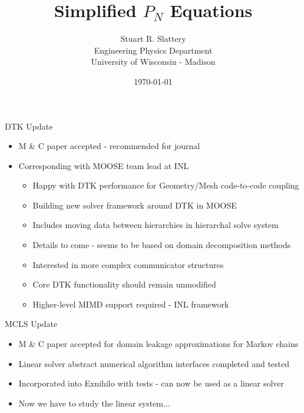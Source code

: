 \documentclass{beamer}
\author{Stuart R. Slattery
  \\ Engineering Physics Department
  \\ University of Wisconsin - Madison
}
\date{\today}
\title{Simplified $P_N$ Equations}
\begin{document}
\maketitle

\begin{frame}{DTK Update}
  \begin{itemize}
  \item M \& C paper accepted - recommended for journal
  \item Corresponding with MOOSE team lead at INL
    \begin{itemize}
    \item Happy with DTK performance for Geometry/Mesh code-to-code
      coupling
    \item Building new solver framework around DTK in MOOSE
    \item Includes moving data between hierarchies in hierarchal
      solve system
    \item Details to come - seems to be based on domain
      decomposition methods
    \item Interested in more complex communicator structures
    \item Core DTK functionality should remain unmodified
    \item Higher-level MIMD support required - INL framework
    \end{itemize}
  \end{itemize}
\end{frame}

\begin{frame}{MCLS Update}
  \begin{itemize}
  \item M \& C paper accepted for domain leakage approximations for
    Markov chains
  \item Linear solver abstract numerical algorithm interfaces
    completed and tested
  \item Incorporated into Exnihilo with tests - can now be used as a
    linear solver
  \item Now we have to study the linear system...
  \end{itemize}
\end{frame}
\end{document}
